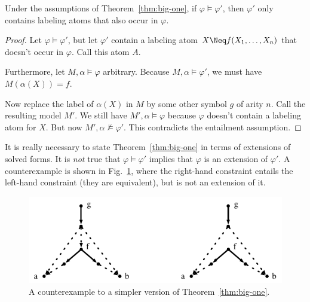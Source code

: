 \begin{lemma} \label{lem:entailment-preserves-labeling-atoms}
  Under the assumptions of
  Theorem~\ref{thm:big-one}, if $\varphi \models
  \varphi'$, then $\varphi'$ only contains labeling atoms that also
  occur in $\varphi$.  
\end{lemma}
\begin{proof}
  Let $\varphi \models \varphi'$, but let $\varphi'$ contain a
  labeling atom $X \Neq f(X_1,\ldots,X_n)$ that doesn't occur in
  $\varphi$.  Call this atom $A$.

  Furthermore, let $M,\alpha \models \varphi$ arbitrary.  Because
  $M,\alpha \models \varphi'$, we must have $M(\alpha(X)) = f$.

  Now replace the label of $\alpha(X)$ in $M$ by some other symbol $g$
  of arity $n$.  Call the resulting model $M'$.  We still have
  $M',\alpha \models \varphi$ because $\varphi$ doesn't contain a
  labeling atom for $X$.  But now $M',\alpha \not\models \varphi'$.
  This contradicts the entailment assumption.
\end{proof}

It is really necessary to state
Theorem~\ref{thm:big-one} in terms of extensions of
solved forms.  It is \emph{not} true that $\varphi \models \varphi'$
implies that $\varphi$ is an extension of $\varphi'$.  A
counterexample is shown in Fig.~\ref{fig:counterexample}, where the
right-hand constraint entails the left-hand constraint (they are
equivalent), but is not an extension of it.

\begin{figure}
  \centering
  \includegraphics[scale=0.6]{pic-extension-counterexample}
  \caption{A counterexample to a simpler version of Theorem~\ref{thm:big-one}.}
  \label{fig:counterexample}
\end{figure}

